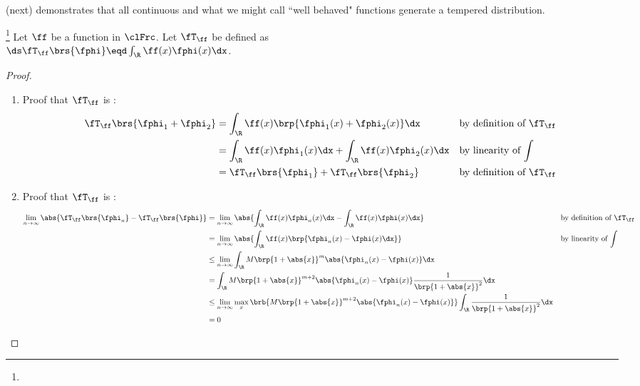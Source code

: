  (next) demonstrates that all continuous and what we might call ``well behaved" 
functions generate a tempered distribution.
\begin{theorem}
\footnote{
  }
\label{thm:tdist_cf}
Let $\ff$ be a function in $\clFrc$.
Let $\fT_\ff$ be defined as
\\\indentx$\ds\fT_\ff\brs{\fphi} \eqd \int_\R \ff(x)\fphi(x)\dx$.
\end{theorem}
\begin{proof}
\begin{enumerate}
  \item Proof that $\fT_\ff$ is :
    \begin{align*}
      \fT_\ff\brs{\fphi_1+\fphi_2}
        &= \int_\R \ff(x)\brp{\fphi_1(x)+\fphi_2(x)}\dx
        && \text{by definition of $\fT_\ff$}
      \\&= \int_\R \ff(x)\fphi_1(x)\dx + \int_\R \ff(x)\fphi_2(x)\dx
        && \text{by linearity of $\int$}
      \\&= \fT_\ff\brs{\fphi_1}+\fT_\ff\brs{\fphi_2}
        && \text{by definition of $\fT_\ff$}
    \end{align*}

  \item Proof that $\fT_\ff$ is :
    \begin{align*}
      \lim_{n\to\infty}\abs{\fT_\ff\brs{\fphi_n}-\fT_\ff\brs{\fphi}}
        &= \lim_{n\to\infty}\abs{\int_\R \ff(x)\fphi_n(x)\dx-\int_\R \ff(x)\fphi(x)\dx}
        && \text{by definition of $\fT_\ff$}
      \\&= \lim_{n\to\infty}\abs{\int_\R \ff(x)\brp{\fphi_n(x)-\fphi(x)\dx}} 
        && \text{by linearity of $\int$}
      \\&\le \lim_{n\to\infty}\int_\R M\brp{1+\abs{x}}^m \abs{\fphi_n(x)-\fphi(x)}\dx
      \\&= \int_\R M\brp{1+\abs{x}}^{m+2} \abs{\fphi_n(x)-\fphi(x)}\frac{1}{\brp{1+\abs{x}}^2}\dx
      \\&\le \lim_{n\to\infty}\max_x\brb{ M\brp{1+\abs{x}}^{m+2} \abs{\fphi_n(x)-\fphi(x)}}\int_\R \frac{1}{\brp{1+\abs{x}}^2}\dx
      \\&= 0
    \end{align*}
\end{enumerate}
\end{proof}


